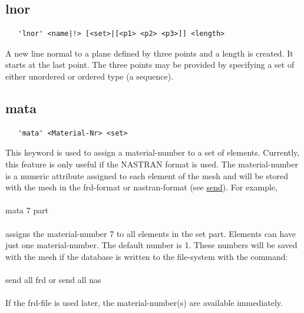 \documentclass{article}
\providecommand{\htmlref}[2]{\hyperref[#2]{#1}}
\begin{document}
\subsection{\label{lnor}lnor}
\begin{verbatim}
   'lnor' <name|!> [<set>|[<p1> <p2> <p3>]] <length> 
\end{verbatim}
A new line normal to a plane defined by three points and a length is created. It starts at the last point. The three points may be provided by specifying a set of either unordered or ordered type (a sequence).

\subsection{\label{mata}mata}
\begin{verbatim}
   'mata' <Material-Nr> <set> 
\end{verbatim}
This keyword is used to assign a material-number to a set of elements. Currently, this feature is only useful if the NASTRAN format is used. The material-number is a numeric attribute assigned to each element of the mesh and will be stored with the mesh in the frd-format or nastran-format (see \htmlref{send}{send}). For example,\\\\
mata 7 part\\\\
assigns the material-number 7 to all elements in the set part. Elements can have just one material-number. The default number is 1. These numbers will be saved with the mesh if the database is written to the file-system with the command:\\\\send all frd  or  send all nas\\\\If the frd-file is used later, the material-number(s) are available immediately.
\end{document}
